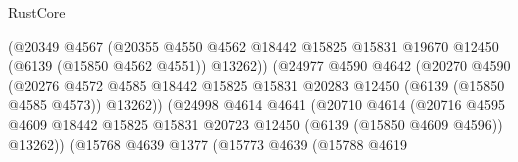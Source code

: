 \begin{lexlean}{RustCore}
\begin{coremodule}
                                        (@20349
                                          @4567
                                          (@20355
                                            @4550
                                            @4562
                                            @18442
                                            @15825
                                            @15831
                                            @19670
                                            @12450
                                            (@6139 (@15850 @4562 @4551))
                                            @13262))
                                        (@24977
                                          @4590
                                          @4642
                                          (@20270
                                            @4590
                                            (@20276
                                              @4572
                                              @4585
                                              @18442
                                              @15825
                                              @15831
                                              @20283
                                              @12450
                                              (@6139 (@15850 @4585 @4573))
                                              @13262))
                                          (@24998
                                            @4614
                                            @4641
                                            (@20710
                                              @4614
                                              (@20716
                                                @4595
                                                @4609
                                                @18442
                                                @15825
                                                @15831
                                                @20723
                                                @12450
                                                (@6139 (@15850 @4609 @4596))
                                                @13262))
                                            (@15768
                                              @4639
                                              @1377
                                              (@15773
                                                @4639
                                                (@15788
                                                  @4619

\end{coremodule}
\end{lexlean}
